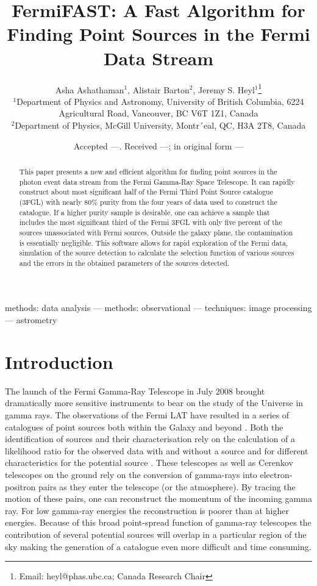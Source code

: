 \documentclass[useAMS,usenatbib]{mn2e}
\title[FermiFAST]{FermiFAST: A Fast Algorithm for Finding Point Sources
in the Fermi Data Stream}
\author[A. Ashathaman, A. Barton and J. S. Heyl]{Asha Ashathaman$^{1}$, Alistair Barton$^{2}$,
  Jeremy S. Heyl$^{1}$\thanks{Email: heyl@phas.ubc.ca; Canada Research Chair} \\
$^{1}$Department of Physics and Astronomy, University of British
  Columbia, 6224 Agricultural Road, Vancouver, BC V6T 1Z1, Canada\\
$^{2}$Department of Physics, McGill University, Montr´eal, QC, H3A 2T8, Canada}
\begin{document}
\date{Accepted ---. Received ---; in original form ---}

\pagerange{\pageref{firstpage}--\pageref{lastpage}} 

\maketitle

\label{firstpage}

\begin{abstract}
  This paper presents a new and efficient algorithm for finding point
  sources in the photon event data stream from the Fermi Gamma-Ray
  Space Telescope.  It can rapidly construct about most significant
  half of the Fermi Third Point Source catalogue (3FGL) with nearly
  80\% purity from the four years of data used to construct the
  catalogue.  If a higher purity sample is desirable, one can achieve
  a sample that includes the most significant third of the Fermi 3FGL
  with only five percent of the sources unassociated with Fermi
  sources.  Outside the galaxy plane, the contamination is essentially
  negligible.  This software allows for rapid exploration of the Fermi
  data, simulation of the source detection to calculate the selection
  function of various sources and the errors in the obtained
  parameters of the sources detected.
\end{abstract}

\begin{keywords}
methods: data analysis --- methods: observational --- techniques:
image processing --- astrometry
\end{keywords}

\section{Introduction}

The launch of the Fermi Gamma-Ray Telescope in July 2008 brought
dramatically more sensitive instruments to bear on the study of the
Universe in gamma rays.  The observations of the Fermi LAT
\citep[e.g.][]{2012ApJS..203....4A} have resulted in a series of
catalogues of point sources both within the Galaxy and beyond
\citep[e.g.][]{2010ApJS..188..405A,2011ApJ...743..171A,
  2012ApJS..199...31N,2013ApJS..208...17A,
  2013ApJS..209...34A,2015ApJS..218...23A}.  Both the identification
of sources and their characterisation rely on the calculation of a
likelihood ratio for the observed data with and without a source and
for different characteristics for the potential source
\citep{1979ApJ...228..939C,1992MNRAS.259..413S,1996ApJ...461..396M}.
These telescopes as well as Cerenkov telescopes on the ground rely on
the conversion of gamma-rays into electron-positron pairs as they
enter the telescope (or the atmosphere).  By tracing the motion of
these pairs, one can reconstruct the momentum of the incoming gamma
ray.  For low gamma-ray energies the reconstruction is poorer than at
higher energies.  Because of this broad point-spread
function of gamma-ray telescopes the contribution of several potential
sources will overlap in a particular region of the sky making the
generation of a catalogue even more difficult and time consuming.
\end{document}
